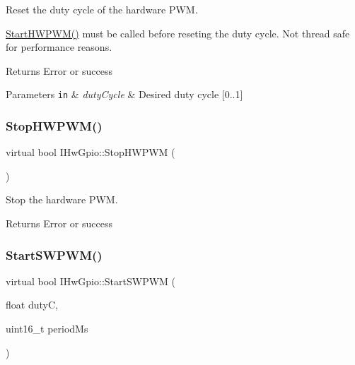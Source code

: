 Reset the duty cycle of the hardware P\+WM. 

\hyperlink{classIHwGpio_a5a6ed0cb7598db00ffd428d4bbf106c0}{Start\+H\+W\+P\+W\+M()} must be called before reseting the duty cycle. Not thread safe for performance reasons. \begin{DoxyReturn}{Returns}
Error or success 
\end{DoxyReturn}

\begin{DoxyParams}[1]{Parameters}
\mbox{\tt in}  & {\em duty\+Cycle} & Desired duty cycle \mbox{[}0..1\mbox{]} \\
\hline
\end{DoxyParams}
\mbox{\label{classIHwGpio_a54d4e297f8f7a250f0b2f548c7073e3d}} 
\subsubsection{\texorpdfstring{Stop\+H\+W\+P\+W\+M()}{StopHWPWM()}}
{\footnotesize\ttfamily virtual bool I\+Hw\+Gpio\+::\+Stop\+H\+W\+P\+WM (\begin{DoxyParamCaption}{ }\end{DoxyParamCaption})\hspace{0.3cm}{\ttfamily [pure virtual]}}



Stop the hardware P\+WM. 

\begin{DoxyReturn}{Returns}
Error or success 
\end{DoxyReturn}
\mbox{\label{classIHwGpio_a282a9b02f28edb2e97f705f38468ee5e}} 
\subsubsection{\texorpdfstring{Start\+S\+W\+P\+W\+M()}{StartSWPWM()}}
{\footnotesize\ttfamily virtual bool I\+Hw\+Gpio\+::\+Start\+S\+W\+P\+WM (\begin{DoxyParamCaption}\item[{float}]{dutyC,  }\item[{uint16\+\_\+t}]{period\+Ms }\end{DoxyParamCaption})\hspace{0.3cm}{\ttfamily [pure virtual]}}



